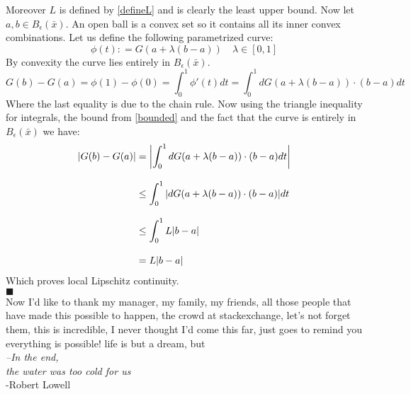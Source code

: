 \documentclass{article}
\DeclarePairedDelimiter{\abs}{\lvert}{\rvert}
\begin{document}
	Moreover $L$ is defined by \ref{defineL} and is clearly the least upper bound. 
	Now let $a,b \in B_\epsilon(\bar x)$. An open ball is a convex set so it contains all its inner convex combinations. Let us define the following parametrized curve:
	\begin{equation}\label{curve}
		\phi(t) : = G(a + \lambda (b-a)) \quad \lambda \in [0,1]
	\end{equation}
	By convexity the curve lies entirely in $B_\epsilon(\bar x )$. 
	\begin{equation*}
		G(b) - G(a) = \phi(1) - \phi(0) = \int_{0}^{1} \phi'(t) dt = \int_{0}^{1} dG(a+ \lambda(b-a)) \cdot (b-a)dt
	\end{equation*}
	Where the last equality is due to the chain rule. 
	\clearpage 
	Now using the triangle inequality for integrals, the bound from \ref{bounded} and the fact that the curve is entirely in $B_\epsilon (\bar x)$ we have:
	\begin{align}
		\abs{G(b) - G(a)} &= \left \vert  \int_{0}^{1}  dG(a+ \lambda(b-a)) \cdot (b-a)dt  \right \vert  \\[2ex]
		&\leq \int_{0}^{1}  \vert dG(a+ \lambda(b-a)) \cdot (b-a) \vert dt\\[2ex]
		&\leq  \int_{0}^{1} L \abs{b-a}\\[2ex]
		&=  L \abs{b-a}
	\end{align}
	Which proves local Lipschitz continuity.\\
	$\blacksquare$\\
	Now I'd like to thank my manager, my family, my friends, all those people that have made this possible to happen, the crowd at stackexchange, let's not forget them, this is incredible, I never thought I'd come this far, just goes to remind you everything is possible! life is but a dream, but \\[3ex]
	\textit{--In the end,\\
		 the water was too cold for us} \\[2ex]
	\hspace{1cm} -Robert Lowell
	
	
	
	

	
	
	
	
	
	
	
	
	
	
	
	
	
	
\end{document}
